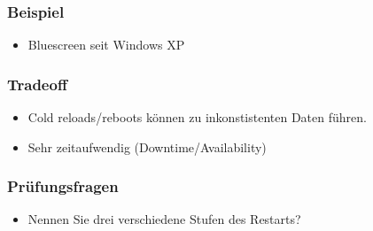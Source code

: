\subsubsection*{Beispiel}


\begin{itemize}
	\item Bluescreen seit Windows XP
\end{itemize}

\subsubsection*{Tradeoff}


\begin{itemize}
	\item Cold reloads/reboots können zu inkonstistenten Daten führen.
	\item Sehr zeitaufwendig (Downtime/Availability)
\end{itemize}

\subsubsection*{Prüfungsfragen}

\begin{itemize}
	\item Nennen Sie drei verschiedene Stufen des Restarts?
\end{itemize}

